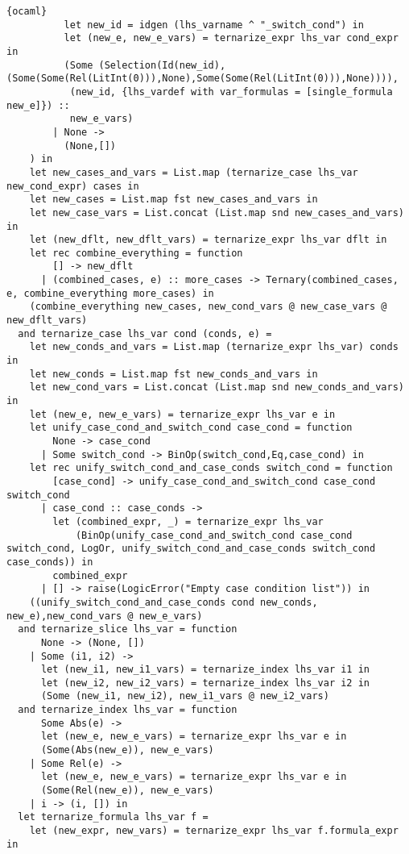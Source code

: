\begin{lstlisting}{ocaml}
          let new_id = idgen (lhs_varname ^ "_switch_cond") in
          let (new_e, new_e_vars) = ternarize_expr lhs_var cond_expr in
          (Some (Selection(Id(new_id),(Some(Some(Rel(LitInt(0))),None),Some(Some(Rel(LitInt(0))),None)))),
           (new_id, {lhs_vardef with var_formulas = [single_formula new_e]}) ::
           new_e_vars)
        | None ->
          (None,[])
    ) in
    let new_cases_and_vars = List.map (ternarize_case lhs_var new_cond_expr) cases in
    let new_cases = List.map fst new_cases_and_vars in
    let new_case_vars = List.concat (List.map snd new_cases_and_vars) in
    let (new_dflt, new_dflt_vars) = ternarize_expr lhs_var dflt in
    let rec combine_everything = function
        [] -> new_dflt
      | (combined_cases, e) :: more_cases -> Ternary(combined_cases, e, combine_everything more_cases) in
    (combine_everything new_cases, new_cond_vars @ new_case_vars @ new_dflt_vars)
  and ternarize_case lhs_var cond (conds, e) =
    let new_conds_and_vars = List.map (ternarize_expr lhs_var) conds in
    let new_conds = List.map fst new_conds_and_vars in
    let new_cond_vars = List.concat (List.map snd new_conds_and_vars) in
    let (new_e, new_e_vars) = ternarize_expr lhs_var e in
    let unify_case_cond_and_switch_cond case_cond = function
        None -> case_cond
      | Some switch_cond -> BinOp(switch_cond,Eq,case_cond) in
    let rec unify_switch_cond_and_case_conds switch_cond = function
        [case_cond] -> unify_case_cond_and_switch_cond case_cond switch_cond
      | case_cond :: case_conds ->
        let (combined_expr, _) = ternarize_expr lhs_var
            (BinOp(unify_case_cond_and_switch_cond case_cond switch_cond, LogOr, unify_switch_cond_and_case_conds switch_cond case_conds)) in
        combined_expr
      | [] -> raise(LogicError("Empty case condition list")) in
    ((unify_switch_cond_and_case_conds cond new_conds, new_e),new_cond_vars @ new_e_vars)
  and ternarize_slice lhs_var = function
      None -> (None, [])
    | Some (i1, i2) ->
      let (new_i1, new_i1_vars) = ternarize_index lhs_var i1 in
      let (new_i2, new_i2_vars) = ternarize_index lhs_var i2 in
      (Some (new_i1, new_i2), new_i1_vars @ new_i2_vars)
  and ternarize_index lhs_var = function
      Some Abs(e) ->
      let (new_e, new_e_vars) = ternarize_expr lhs_var e in
      (Some(Abs(new_e)), new_e_vars)
    | Some Rel(e) ->
      let (new_e, new_e_vars) = ternarize_expr lhs_var e in
      (Some(Rel(new_e)), new_e_vars)
    | i -> (i, []) in
  let ternarize_formula lhs_var f =
    let (new_expr, new_vars) = ternarize_expr lhs_var f.formula_expr in

\end{lstlisting}
